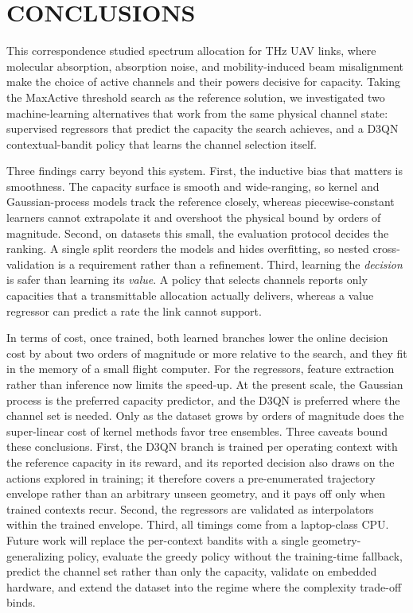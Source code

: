 \documentclass[correspondence]{IEEEtaes}
\begin{document}
\section{CONCLUSIONS}
\label{sec:conc}
This correspondence studied spectrum allocation for THz UAV links, where molecular
absorption, absorption noise, and mobility-induced beam misalignment make the choice of
active channels and their powers decisive for capacity. Taking the MaxActive threshold
search as the reference solution, we investigated two machine-learning alternatives that
work from the same physical channel state: supervised regressors that predict the
capacity the search achieves, and a D3QN contextual-bandit policy that learns the
channel selection itself.

Three findings carry beyond this system. First, the inductive bias that matters is
smoothness. The capacity surface is smooth and wide-ranging, so kernel and
Gaussian-process models track the reference closely, whereas piecewise-constant learners
cannot extrapolate it and overshoot the physical bound by orders of magnitude. Second, on
datasets this small, the evaluation protocol decides the ranking. A single split reorders
the models and hides overfitting, so nested cross-validation is a requirement rather than
a refinement. Third, learning the \emph{decision} is safer than learning its
\emph{value}. A policy that selects channels reports only capacities that a transmittable
allocation actually delivers, whereas a value regressor can predict a rate the link
cannot support.

In terms of cost, once trained, both learned branches lower the online decision cost by
about two orders of magnitude or more relative to the search, and they fit in the memory
of a small flight computer. For the regressors, feature extraction rather than inference
now limits the speed-up. At the present scale, the Gaussian process is the preferred
capacity predictor, and the D3QN is preferred where the channel set is needed. Only as the
dataset grows by orders of magnitude does the super-linear cost of kernel methods favor
tree ensembles. Three caveats bound these conclusions. First, the D3QN branch is trained
per operating context with the reference capacity in its reward, and its reported
decision also draws on the actions explored in training; it therefore covers a
pre-enumerated trajectory envelope rather than an arbitrary unseen geometry, and it pays
off only when trained contexts recur. Second, the regressors are validated as
interpolators within the trained envelope. Third, all timings come from a laptop-class
CPU. Future work will replace the per-context bandits with a single geometry-generalizing
policy, evaluate the greedy policy without the training-time fallback, predict the channel
set rather than only the capacity, validate on embedded hardware, and extend the dataset
into the regime where the complexity trade-off binds.
\end{document}
